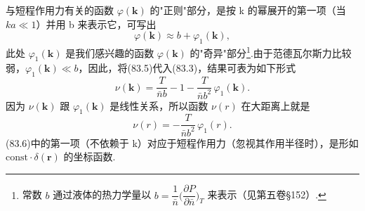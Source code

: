 与短程作用力有关的函数 $\varphi(\bm{k})$ 的"正则"部分，是按 k 的幂展开的第一项（当 $ka\ll 1$）并用 b 来表示它，可写出
\begin{equation}
  \varphi(\bm{k})\approx b+\varphi_1(\bm{k}),
\end{equation}
此处 $\varphi_1(\bm{k})$ 是我们感兴趣的函数 $\varphi(\bm{k})$ 的"奇异"部分\footnote{常数 $b$ 通过液体的热力学量以 $b=\dfrac{1}{\bar{n}}\biggl(\dfrac{\partial P}{\partial\bar{n}}\biggr)_{T}$ 来表示（见第五卷§152）.}.由于范德瓦尔斯力比较弱，$\varphi_1(\bm{k})\ll b$，因此，将(83.5)代入(83.3)，结果可表为如下形式
\begin{equation}
  \nu(\bm{k})=\frac{T}{\bar{n}b}-1-\frac{T}{\bar{n}b^{2}}\,\varphi_1(\bm{k}).
\end{equation}
因为 $\nu(\bm{k})$ 跟 $\varphi_1(\bm{k})$ 是线性关系，所以函数 $\nu(r)$ 在大距离上就是
\begin{equation}
  \nu(r)=-\frac{T}{\bar{n}b^{2}}\,\varphi_1(r).
\end{equation}
(83.6)中的第一项（不依赖于 k）对应于短程作用力（忽视其作用半径时），是形如 $\mathrm{const}\cdot\delta(\bm{r})$ 的坐标函数.


